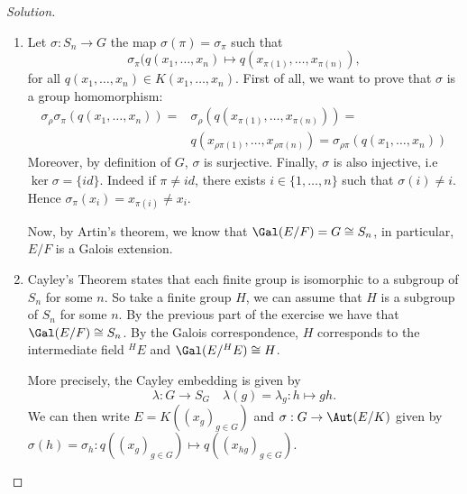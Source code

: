 \documentclass[a4paper,10pt,reqno]{amsart}
\newenvironment{sol}
  {\renewcommand\qedsymbol{$\blacksquare$}\begin{proof}[Solution]}
  {\end{proof}}
\begin{document}
\begin{sol}
    ~
    \begin{enumerate}[label=(\roman*)]
    \item Let $\sigma:S_n\to G$ the map $\sigma(\pi)=\sigma_\pi$ such that 
    \[\sigma_\pi(q(x_1,\ldots,x_n)\mapsto q(x_{\pi(1)},\ldots,x_{\pi(n)}),
        \]
        for all $q(x_1,\ldots, x_n)\in K(x_1,\ldots,x_n)$.
    First of all, we want to prove that $\sigma$ is a 
    group homomorphism:
    \begin{align*}
        \sigma_\rho\sigma_\pi(q(x_1,\ldots,x_n))=
        &\sigma_\rho(q(x_{\pi(1)},\ldots,x_{\pi(n)}))=\\
        &q(x_{\rho\pi(1)},\ldots,x_{\rho\pi(n)})=\sigma_{\rho\pi}(q(x_1,\ldots,x_n))
    \end{align*}
    Moreover, by definition of $G$, $\sigma$ is surjective.
    Finally, $\sigma$ is also injective, i.e $\ker\sigma=\{id\}$.
    Indeed if $\pi\neq id$, there exists $i\in\{1,\dots,n\}$
    such that $\sigma(i)\neq i$.
    Hence $\sigma_\pi(x_i)=x_{\pi(i)}\neq x_i$.

    Now, by Artin's theorem, we know that 
    $\Gal(E/F)=G\cong S_n$,
    in particular, $E/F$ is a Galois extension.
    
    \item Cayley's Theorem states that each finite group is isomorphic to a subgroup of $S_n$ for some $n$.
    So take a finite group $H$, we can assume that $H$
    is a subgroup of $S_n$ for some $n$.
    By the previous part of the exercise we have that
    $\Gal(E/F)\cong S_n$.
    By the Galois correspondence, $H$ corresponds to 
    the intermediate field ${}^HE$ and $\Gal(E/{}^HE)\cong H$.

    More precisely, the Cayley embedding is given by
    \[
    \lambda: G\to S_G\quad \lambda(g)=\lambda_g:h\mapsto gh.
    \]
    We can then write $E=K((x_g)_{g\in G})$
    and $\sigma:G\to \Aut(E/K)$ given by $\sigma(h)=\sigma_h:q((x_g)_{g\in G})\mapsto q((x_{hg})_{g\in G})$.\qedhere
    \end{enumerate}
\end{sol}
\end{document}
